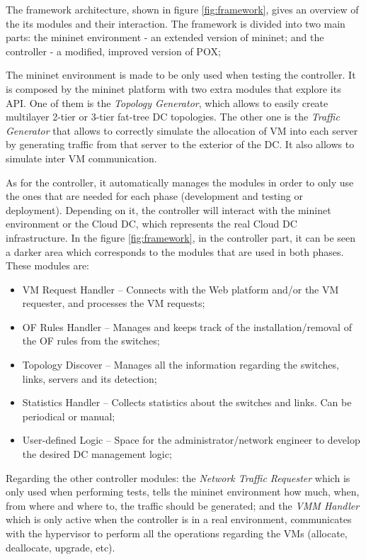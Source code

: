 \documentclass[12pt,english,oneside]{book}
\begin{document}
The framework architecture, shown in figure \ref{fig:framework}, gives an overview of the its modules and their interaction.
The framework is divided into two main parts: the mininet environment - an extended version of mininet; and the controller - a modified, improved version of POX;

The mininet environment is made to be only used when testing the controller.
It is composed by the mininet platform with two extra modules that explore its API.
One of them is the {\it Topology Generator}, which allows to easily create multilayer 2-tier or 3-tier fat-tree DC topologies.
The other one is the {\it Traffic Generator} that allows to correctly simulate the allocation of VM into each server by generating traffic from that server to the exterior of the DC. It also allows to simulate inter VM communication.

As for the controller, it automatically manages the modules in order to only use the ones that are needed for each phase (development and testing or deployment).
Depending on it, the controller will interact with the mininet environment or the Cloud DC, which represents the real Cloud DC infrastructure.
In the figure \ref{fig:framework}, in the controller part, it can be seen a darker area which corresponds to the modules that are used in both phases. These modules are:
\begin{itemize}
  \item VM Request Handler -- Connects with the Web platform and/or the VM requester, and processes the VM requests;
  \item OF Rules Handler -- Manages and keeps track of the installation/removal of the OF rules from the switches;
  \item Topology Discover -- Manages all the information regarding the switches, links, servers and its detection;
  \item Statistics Handler -- Collects statistics about the switches and links. Can be periodical or manual;
  \item User-defined Logic -- Space for the administrator/network engineer to develop the desired DC management logic;
\end{itemize}

Regarding the other controller modules: the {\it Network Traffic Requester} which is only used when performing tests, tells the mininet environment how much, when, from where and where to, the traffic should be generated; and the {\it VMM Handler} which is only active when the controller is in a real environment, communicates with the hypervisor to perform all the operations regarding the VMs (allocate, deallocate, upgrade, etc).
\end{document}
